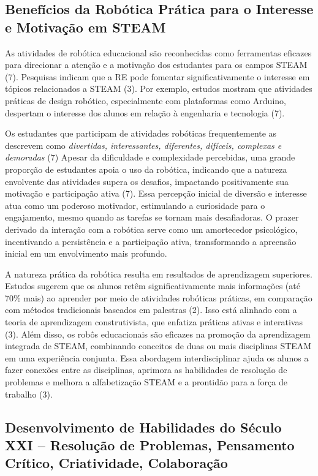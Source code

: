 \documentclass[%
  a4paper,%
  12pt,%
  fleqn,%
  english,%
  brazilian,%
]{article}
\begin{document}
\subsection{Benefícios da Robótica Prática para o Interesse e Motivação em STEAM}
As atividades de robótica educacional são reconhecidas como ferramentas eficazes para direcionar a atenção e a motivação dos estudantes para os campos STEAM (7). Pesquisas indicam que a RE pode fomentar significativamente o interesse em tópicos relacionados a STEAM (3). Por exemplo, estudos mostram que atividades práticas de design robótico, especialmente com plataformas como Arduino, despertam o interesse dos alunos em relação à engenharia e tecnologia (7).

Os estudantes que participam de atividades robóticas frequentemente as descrevem como \emph{divertidas, interessantes, diferentes, difíceis, complexas e demoradas} (7) Apesar da dificuldade e complexidade percebidas, uma grande proporção de estudantes apoia o uso da robótica, indicando que a natureza envolvente das atividades supera os desafios, impactando positivamente sua motivação e participação ativa (7). Essa percepção inicial de diversão e interesse atua como um poderoso motivador, estimulando a curiosidade para o engajamento, mesmo quando as tarefas se tornam mais desafiadoras. O prazer derivado da interação com a robótica serve como um amortecedor psicológico, incentivando a persistência e a participação ativa, transformando a apreensão inicial em um envolvimento mais profundo.

A natureza prática da robótica resulta em resultados de aprendizagem superiores. Estudos sugerem que os alunos retêm significativamente mais informações (até 70\% mais) ao aprender por meio de atividades robóticas práticas, em comparação com métodos tradicionais baseados em palestras (2). Isso está alinhado com a teoria de aprendizagem construtivista, que enfatiza práticas ativas e interativas (3). Além disso, os robôs educacionais são eficazes na promoção da aprendizagem integrada de STEAM, combinando conceitos de duas ou mais disciplinas STEAM em uma experiência conjunta. Essa abordagem interdisciplinar ajuda os alunos a fazer conexões entre as disciplinas, aprimora as habilidades de resolução de problemas e melhora a alfabetização STEAM e a prontidão para a força de trabalho (3).

\subsection{Desenvolvimento de Habilidades do Século XXI -- Resolução de Problemas, Pensamento Crítico, Criatividade, Colaboração}
\end{document}
